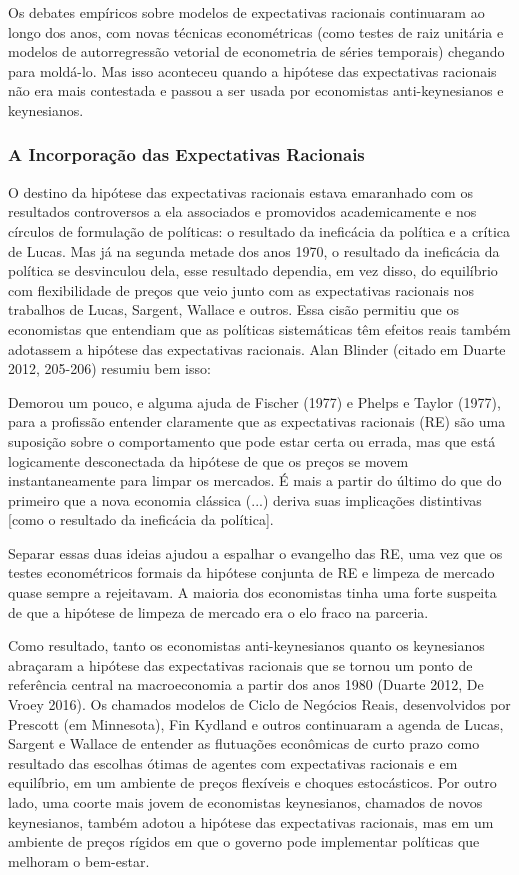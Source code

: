 \documentclass[12pt]{article}
\begin{document}
Os debates empíricos sobre modelos de expectativas racionais continuaram ao longo dos anos, com novas técnicas econométricas (como testes de raiz unitária e modelos de autorregressão vetorial de econometria de séries temporais) chegando para moldá-lo. Mas isso aconteceu quando a hipótese das expectativas racionais não era mais contestada e passou a ser usada por economistas anti-keynesianos e keynesianos.

\subsubsection{\textbf{A Incorporação das Expectativas Racionais}}

O destino da hipótese das expectativas racionais estava emaranhado com os resultados controversos a ela associados e promovidos academicamente e nos círculos de formulação de políticas: o resultado da ineficácia da política e a crítica de Lucas. Mas já na segunda metade dos anos 1970, o resultado da ineficácia da política se desvinculou dela, esse resultado dependia, em vez disso, do equilíbrio com flexibilidade de preços que veio junto com as expectativas racionais nos trabalhos de Lucas, Sargent, Wallace e outros. Essa cisão permitiu que os economistas que entendiam que as políticas sistemáticas têm efeitos reais também adotassem a hipótese das expectativas racionais. Alan Blinder (citado em Duarte 2012, 205-206) resumiu bem isso:

Demorou um pouco, e alguma ajuda de Fischer (1977) e Phelps e Taylor (1977), para a profissão entender claramente que as expectativas racionais (RE) são uma suposição sobre o comportamento que pode estar certa ou errada, mas que está logicamente desconectada da hipótese de que os preços se movem instantaneamente para limpar os mercados. É mais a partir do último do que do primeiro que a nova economia clássica (...) deriva suas implicações distintivas [como o resultado da ineficácia da política].

Separar essas duas ideias ajudou a espalhar o evangelho das RE, uma vez que os testes econométricos formais da hipótese conjunta de RE e limpeza de mercado quase sempre a rejeitavam. A maioria dos economistas tinha uma forte suspeita de que a hipótese de limpeza de mercado era o elo fraco na parceria.

Como resultado, tanto os economistas anti-keynesianos quanto os keynesianos abraçaram a hipótese das expectativas racionais que se tornou um ponto de referência central na macroeconomia a partir dos anos 1980 (Duarte 2012, De Vroey 2016). Os chamados modelos de Ciclo de Negócios Reais, desenvolvidos por Prescott (em Minnesota), Fin Kydland e outros continuaram a agenda de Lucas, Sargent e Wallace de entender as flutuações econômicas de curto prazo como resultado das escolhas ótimas de agentes com expectativas racionais e em equilíbrio, em um ambiente de preços flexíveis e choques estocásticos. Por outro lado, uma coorte mais jovem de economistas keynesianos, chamados de novos keynesianos, também adotou a hipótese das expectativas racionais, mas em um ambiente de preços rígidos em que o governo pode implementar políticas que melhoram o bem-estar.
\end{document}

